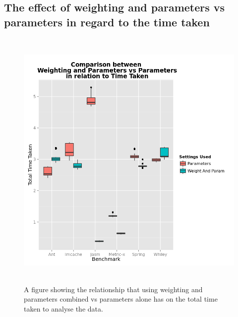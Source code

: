 \begin{appendices}
\chapter{The effect of weighting and parameters vs parameters in regard to the time taken}
\begin{figure}[h]
\centering
\includegraphics[width=\textwidth,height=13cm]{WeightnParamvParamTime.png}
\caption{A figure showing the relationship that using weighting and parameters combined vs parameters alone has on the total time taken to analyse the data.}
\label{fig:weightparamvparamtime}
\end{figure}




\end{appendices}